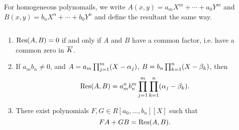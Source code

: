 For homogeneous polynomails, we write $A(x,y)=a_mX^m+\cdots + a_0Y^m$ and $B(x,y)=b_nX^n+\cdots + b_0Y^n$ and 
define the resultant the same way.
\begin{pr}\label{resultant-properties}$\,$
\begin{enumerate}
\item
$\operatorname{Res}(A,B)=0$ if and only if $A$ and $B$ have a common factor, i.e. have a common zero in $\overline{K}$.
\item
If $a_mb_n\ne 0$, and $A=a_m\prod_{j=1}^m(X-\alpha_j)$, $B=b_n\prod_{k=1}^n(X-\beta_k)$, then
\[
\operatorname{Res}(A,B)=a_m^nb_n^m\prod_{j=1}^m\prod_{k=1}^n (\alpha_j-\beta_k).
\]
\item
There exist polynomials $F,G\in R[a_0,\ldots, b_n][X]$ such that
\[
FA+GB=\operatorname{Res}(A,B).
\]
\end{enumerate}
\end{pr}
